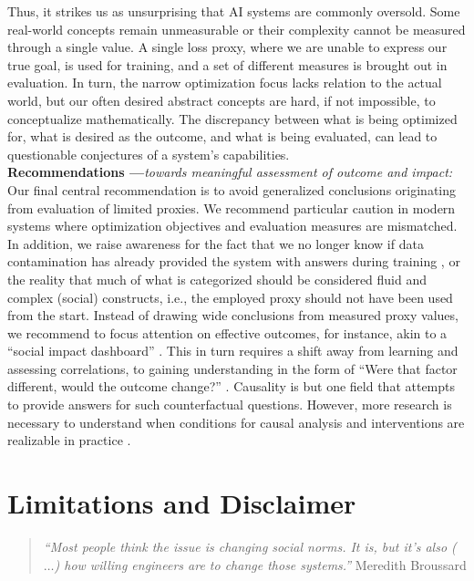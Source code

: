 \documentclass[manuscript,screen,authorversion,nonacm]{acmart}
\begin{document}
Thus, it strikes us as unsurprising that AI systems are commonly oversold. Some real-world concepts remain unmeasurable or their complexity cannot be measured through a single value. A single loss proxy, where we are unable to express our true goal, is used for training, and a set of different measures is brought out in evaluation. In turn, the narrow optimization focus lacks relation to the actual world, but our often desired abstract concepts are hard, if not impossible, to conceptualize mathematically. The discrepancy between what is being optimized for, what is desired as the outcome, and what is being evaluated, can lead to questionable conjectures of a system's capabilities. \\

\noindent \textbf{Recommendations ---}\textit{towards meaningful assessment of outcome and impact:} \\
Our final central recommendation is to avoid generalized conclusions originating from evaluation of limited proxies. We recommend particular caution in modern systems where optimization objectives and evaluation measures are mismatched. In addition, we raise awareness for the fact that we no longer know if data contamination has already provided the system with answers during training \cite{Borji2023ChatGPTFailures}, or the reality that much of what is categorized should be considered fluid and complex (social) constructs, i.e., the employed proxy should not have been used from the start. 
Instead of drawing wide conclusions from measured proxy values, we recommend to focus attention on effective outcomes, for instance, akin to a ``social impact dashboard'' \cite{ghosh2024simp}. This in turn requires a shift away from learning and assessing correlations, to gaining understanding in the form of ``Were that factor different, would the outcome change?'' \cite{Pearl2009Causality}. Causality is but one field that attempts to provide answers for such counterfactual questions. However, more research is necessary to understand when conditions for causal analysis and interventions are realizable in practice \cite{Kusner2017CounterfactualFairness}.


\section{Limitations and Disclaimer}
\begin{quote}
	\emph{``Most people think the issue is changing social norms. It is, but it’s also ($\ldots$) how willing engineers are to change those systems.''} Meredith Broussard \cite{broussard2023more}
\end{quote}
\end{document}

